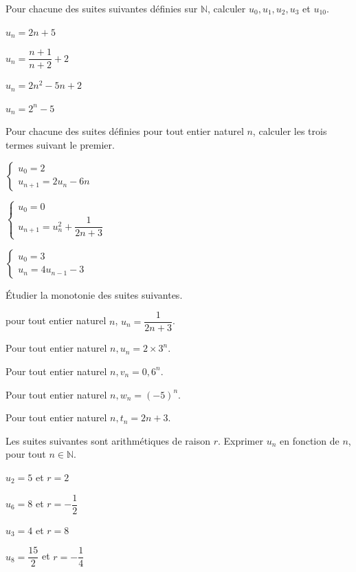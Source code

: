 \documentclass[12pt,a4paper]{article}  %
\begin{document}
Pour chacune des suites suivantes définies sur $\mathbb{N}$, calculer $u_{0}, u_{1}, u_{2}, u_{3}$ et $u_{10}$.
\begin{enumMet}
    \item {} $u_{n}=2 n+5$
    \item $u_{n}=\dfrac{n+1}{n+2}+2$
    \item $u_{n}=2n^{2}-5 n+2$
    \item $u_{n}=2^{n}-5$
\end{enumMet}  

Pour chacune des suites définies pour tout entier naturel $n$, calculer les trois termes suivant le premier.
\begin{enumMet}
    \item $\left\{\begin{array}{l}u_{0}=2 \\ u_{n+1}=2u_{n}-6 n\end{array}\right.$
    \item $\left\{\begin{array}{l}u_{0}=0 \\ u_{n+1}=u_{n}^{2}+\dfrac{1}{2 n+3}\end{array}\right.$
    \item {} $\left\{\begin{array}{l}u_{0}=3 \\ u_{n}=4 u_{n-1}-3\end{array}\right.$
\end{enumMet}

Étudier la monotonie des suites suivantes.
\begin{enumMet}
    \item pour tout entier naturel $n$, $u_{n}=\dfrac{1}{2 n+3}$.
    \item Pour tout entier naturel $n, u_{n}=2\times3^{n}$.
    \item Pour tout entier naturel $n, v_{n}=0,6^{n}$.
    \item Pour tout entier naturel $n, w_{n}=(-5)^{n}$.
    \item {} Pour tout entier naturel $n, t_{n}=2 n+3$.
\end{enumMet}

Les suites suivantes sont arithmétiques de raison $r$. Exprimer $u_{n}$ en fonction de $n$, pour tout $n \in \mathbb{N}$.
\begin{enumMet}
    \item $u_{2}=5$ et $r=2$
    \item $u_{6}=8$ et $r=-\dfrac{1}{2}$
    \item {} $u_{3}=4$ et $r=8$
    \item $u_{8}=\dfrac{15}{2}$ et $r=-\dfrac{1}{4}$
\end{enumMet}
\end{document}
